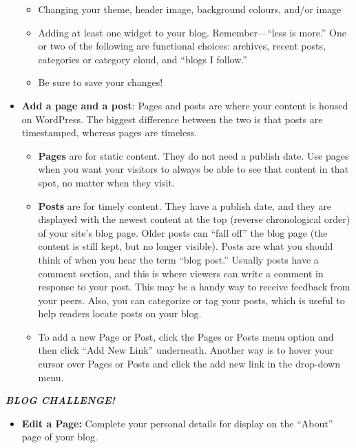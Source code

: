 \documentclass[
  letterpaper,
  DIV=11,
  numbers=noendperiod]{scrreprt}
\providecommand{\tightlist}{%
  \setlength{\itemsep}{0pt}\setlength{\parskip}{0pt}}\usepackage{longtable,booktabs,array}
\begin{document}
\begin{tcolorbox}
\begin{itemize}
  \begin{itemize}
  \tightlist
  \item
    Changing your theme, header image, background colours, and/or image
  \item
    Adding at least one widget to your blog. Remember---``less is
    more.'' One or two of the following are functional choices:
    archives, recent posts, categories or category cloud, and ``blogs I
    follow.''
  \item
    Be sure to save your changes!
  \end{itemize}
\item
  \textbf{Add a page and a post}: Pages and posts are where your content
  is housed on WordPress. The biggest difference between the two is that
  posts are timestamped, whereas pages are timeless.

  \begin{itemize}
  \tightlist
  \item
    \textbf{Pages} are for static content. They do not need a publish
    date. Use pages when you want your visitors to always be able to see
    that content in that spot, no matter when they visit.
  \item
    \textbf{Posts} are for timely content. They have a publish date, and
    they are displayed with the newest content at the top (reverse
    chronological order) of your site's blog page. Older posts can
    ``fall off'' the blog page (the content is still kept, but no longer
    visible). Posts are what you should think of when you hear the term
    ``blog post.'' Usually posts have a comment section, and this is
    where viewers can write a comment in response to your post. This may
    be a handy way to receive feedback from your peers. Also, you can
    categorize or tag your posts, which is useful to help readers locate
    posts on your blog.
  \item
    To add a new Page or Post, click the Pages or Posts menu option and
    then click ``Add New Link'' underneath. Another way is to hover your
    cursor over Pages or Posts and click the add new link in the
    drop-down menu.
  \end{itemize}
\end{itemize}

\textbf{\emph{BLOG CHALLENGE!}}

\begin{itemize}
\tightlist
\item
  \textbf{Edit a Page:} Complete your personal details for display on
  the ``About'' page of your blog.


\end{itemize}
\end{tcolorbox}
\end{document}
